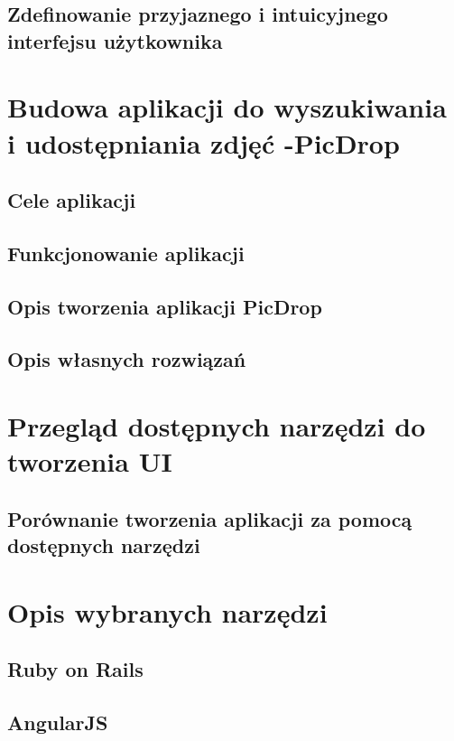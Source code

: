 \documentclass[brudnopis]{xmgr}
\begin{document}
\section{Zdefinowanie przyjaznego i intuicyjnego interfejsu użytkownika}

\chapter{Budowa aplikacji do wyszukiwania i udostępniania zdjęć -PicDrop }

\section{Cele aplikacji}

\section{Funkcjonowanie aplikacji}

\section{Opis tworzenia aplikacji PicDrop}

\section{Opis własnych rozwiązań}   

\chapter{Przegląd dostępnych narzędzi do tworzenia UI }

\section{ Porównanie tworzenia aplikacji za pomocą dostępnych narzędzi\label{s:dsssl}}

\chapter{Opis wybranych narzędzi\label{s:xsl}}

\section{Ruby on Rails}

\section{AngularJS}
\end{document}
